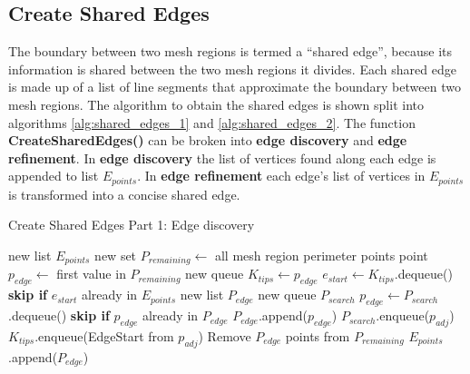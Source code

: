 \subsection{Create Shared Edges}
The boundary between two mesh regions is termed a ``shared edge'', because its information is shared between the two mesh regions it divides.
Each shared edge is made up of a list of line segments that approximate the boundary between two mesh regions.
The algorithm to obtain the shared edges is shown split into algorithms \ref{alg:shared_edges_1} and \ref{alg:shared_edges_2}.
The function \textbf{CreateSharedEdges()} can be broken into \textbf{edge discovery} and \textbf{edge refinement}.
In \textbf{edge discovery} the list of vertices found along each edge is appended to list $E_{points}$.
In \textbf{edge refinement} each edge's list of vertices in $E_{points}$ is transformed into a concise shared edge.

\begin{algorithm}[!htb]
	\caption{Create Shared Edges Part 1: Edge discovery}\label{alg:shared_edges_1}
\begin{algorithmic}[1]
	\State new list $E_{points}$ 
	\State new set $P_{remaining} \leftarrow$ all mesh region perimeter points
	\label{alg:shared_edges:while_k_remaining}
		\State point $p_{edge} \leftarrow$ first value in $P_{remaining}$
		\State new queue $K_{tips} \leftarrow p_{edge}$ 
		\label{alg:shared_edges:while_k_tips}
			\State $e_{start} \leftarrow K_{tips}$.dequeue()
			\State \textbf{skip if} $e_{start}$ already in $E_{points}$
			\State new list $P_{edge}$ 
			\State new queue $P_{search}$ 
				\State $p_{edge} \leftarrow P_{search}$.dequeue()
				\State \textbf{skip if} $p_{edge}$ already in $P_{edge}$
				\State $P_{edge}$.append($p_{edge}$)
						\State $P_{search}$.enqueue($p_{adj}$)
					\EndIf
						\State $K_{tips}$.enqueue(EdgeStart from $p_{adj}$)
					\EndIf
				\EndFor
			\EndWhile
			\State Remove $P_{edge}$ points from $P_{remaining}$
			\State $E_{points}$.append($P_{edge}$)
		\EndWhile
	\EndWhile
\end{algorithmic}
\end{algorithm}

